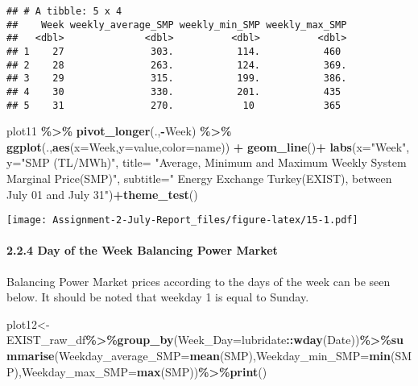 \documentclass[
]{article}
\newenvironment{Shaded}{\begin{snugshade}}{\end{snugshade}}
\newcommand{\DataTypeTok}[1]{\textcolor[rgb]{0.13,0.29,0.53}{#1}}
\newcommand{\KeywordTok}[1]{\textcolor[rgb]{0.13,0.29,0.53}{\textbf{#1}}}
\newcommand{\NormalTok}[1]{#1}
\newcommand{\OperatorTok}[1]{\textcolor[rgb]{0.81,0.36,0.00}{\textbf{#1}}}
\newcommand{\StringTok}[1]{\textcolor[rgb]{0.31,0.60,0.02}{#1}}
\begin{document}
\begin{verbatim}
## # A tibble: 5 x 4
##    Week weekly_average_SMP weekly_min_SMP weekly_max_SMP
##   <dbl>              <dbl>          <dbl>          <dbl>
## 1    27               303.           114.           460 
## 2    28               263.           124.           369.
## 3    29               315.           199.           386.
## 4    30               330.           201.           435 
## 5    31               270.            10            365
\end{verbatim}

\begin{Shaded}
\begin{Highlighting}[]
\NormalTok{plot11 }\OperatorTok{\%\textgreater{}\%}\StringTok{ }\KeywordTok{pivot\_longer}\NormalTok{(.,}\OperatorTok{{-}}\NormalTok{Week) }\OperatorTok{\%\textgreater{}\%}\StringTok{ }\KeywordTok{ggplot}\NormalTok{(.,}\KeywordTok{aes}\NormalTok{(}\DataTypeTok{x=}\NormalTok{Week,}\DataTypeTok{y=}\NormalTok{value,}\DataTypeTok{color=}\NormalTok{name)) }\OperatorTok{+}\StringTok{ }\KeywordTok{geom\_line}\NormalTok{()}\OperatorTok{+}
\StringTok{       }\KeywordTok{labs}\NormalTok{(}\DataTypeTok{x=}\StringTok{"Week"}\NormalTok{, }\DataTypeTok{y=}\StringTok{"SMP (TL/MWh)"}\NormalTok{, }
            \DataTypeTok{title=}  \StringTok{"Average, Minimum and Maximum Weekly System Marginal Price(SMP)"}\NormalTok{,}
            \DataTypeTok{subtitle=}\StringTok{" Energy Exchange Turkey(EXIST), between July 01 and July 31"}\NormalTok{)}\OperatorTok{+}\KeywordTok{theme\_test}\NormalTok{()}
\end{Highlighting}
\end{Shaded}

\texttt{[image: Assignment-2-July-Report\_files/figure-latex/15-1.pdf]}

\hypertarget{day-of-the-week-balancing-power-market}{%
\paragraph{2.2.4 Day of the Week Balancing Power
Market}\label{day-of-the-week-balancing-power-market}}

Balancing Power Market prices according to the days of the week can be
seen below. It should be noted that weekday 1 is equal to Sunday.

\begin{Shaded}
\begin{Highlighting}[]
\NormalTok{plot12\textless{}{-}EXIST\_raw\_df}\OperatorTok{\%\textgreater{}\%}\KeywordTok{group\_by}\NormalTok{(}\DataTypeTok{Week\_Day=}\NormalTok{lubridate}\OperatorTok{::}\KeywordTok{wday}\NormalTok{(Date))}\OperatorTok{\%\textgreater{}\%}\KeywordTok{summarise}\NormalTok{(}\DataTypeTok{Weekday\_average\_SMP=}\KeywordTok{mean}\NormalTok{(SMP),}\DataTypeTok{Weekday\_min\_SMP=}\KeywordTok{min}\NormalTok{(SMP),}\DataTypeTok{Weekday\_max\_SMP=}\KeywordTok{max}\NormalTok{(SMP))}\OperatorTok{\%\textgreater{}\%}\KeywordTok{print}\NormalTok{()}
\end{Highlighting}
\end{Shaded}
\end{document}
